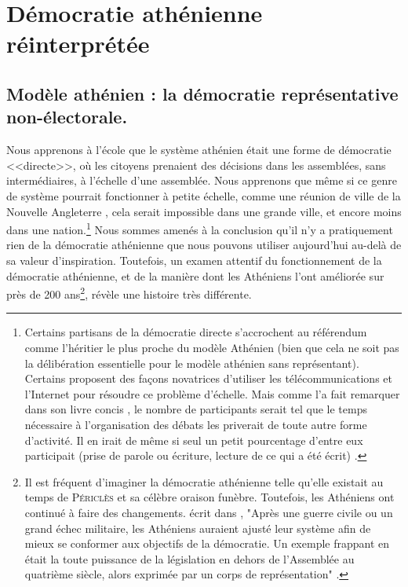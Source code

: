 \section{Démocratie athénienne réinterprétée}
\subsection{Modèle athénien : la démocratie représentative
  non-électorale.}
Nous apprenons à l'école que le système athénien était une forme de
démocratie <<directe>>, où les citoyens prenaient des décisions dans les
assemblées, sans intermédiaires, à l'échelle d'une assemblée. Nous
apprenons 
que même si ce genre de système pourrait fonctionner à petite échelle,
comme une réunion de ville de la Nouvelle Angleterre
\cite{bryan03}, cela serait impossible dans une grande
ville, et encore moins dans une nation.\footnote{%
  Certains partisans de la démocratie directe s'accrochent au
  référendum comme l'héritier le plus proche du modèle Athénien (bien
  que cela ne soit pas la délibération essentielle pour le modèle athénien sans
  représentant). Certains proposent des façons novatrices d'utiliser
  les télécommunications et l'Internet pour résoudre ce problème
  d'échelle. Mais comme  \cite{dahl70} l'a fait remarquer dans
  son livre concis \cite{dahl70} \cite{dahl70}, le nombre de
  participants serait tel que le temps nécessaire à l'organisation des
  débats les priverait de toute autre forme d'activité. Il en irait de
  même si seul un petit pourcentage d'entre eux participait (prise de
  parole ou écriture, lecture de ce qui a été écrit) \cite{dahl70}.%
} 
Nous sommes amenés à la conclusion qu'il n'y a
pratiquement rien de la démocratie athénienne que nous pouvons
utiliser aujourd'hui au-delà de sa valeur d'inspiration. Toutefois, un
examen attentif du fonctionnement de la démocratie athénienne, et de la
manière dont les Athéniens l'ont améliorée sur près de 200
ans\footnote{%
  Il est fréquent d'imaginer la démocratie athénienne telle
  qu'elle existait au temps de \textsc{Périclès} et sa célèbre oraison
  funèbre. Toutefois, les Athéniens ont continué à faire des
  changements.  \cite{wood05} écrit dans \cite{wood05},
  "Après une guerre civile ou un grand échec militaire, les Athéniens
  auraient ajusté leur système afin de mieux se conformer aux
  objectifs de la démocratie. Un exemple frappant en était la
  toute puissance de la législation en dehors de l'Assemblée au
  quatrième siècle, alors exprimée par un corps de représentation"
  \cite{wood05}.%
  }, révèle une histoire très différente. 

